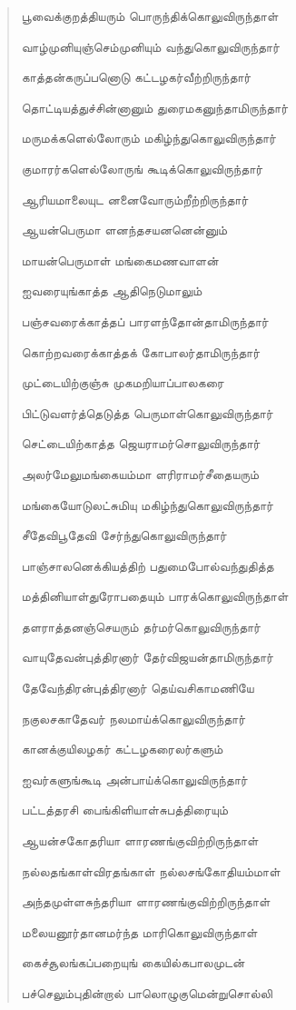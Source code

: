 \documentclass{article}
\begin{document}
\begin{quotation}
{பூவைக்குறத்தியரும் பொருந்திக்கொலுவிருந்தாள்

வாழ்முனியுஞ்செம்முனியும் வந்துகொலுவிருந்தார்

காத்தன்கருப்பனொடு கட்டழகர்வீற்றிருந்தார்

தொட்டியத்துச்சின்னானும் துரைமகனுந்தாமிருந்தார்

மருமக்களெல்லோரும் மகிழ்ந்துகொலுவிருந்தார்

குமாரர்களெல்லோருங் கூடிக்கொலுவிருந்தார்

ஆரியமாலையுட னனைவோரும்றீற்றிருந்தார்

ஆயன்பெருமா ளனந்தசயனனென்னும்

மாயன்பெருமாள் மங்கைமணவாளன்

ஐவரையுங்காத்த ஆதிநெடுமாலும்

பஞ்சவரைக்காத்தப் பாரளந்தோன்தாமிருந்தார்

கொற்றவரைக்காத்தக் கோபாலர்தாமிருந்தார்

முட்டையிற்குஞ்சு முகமறியாப்பாலகரை

பிட்டுவளர்த்தெடுத்த பெருமாள்கொலுவிருந்தார்

செட்டையிற்காத்த ஜெயராமர்சொலுவிருந்தார்

அலர்மேலுமங்கையம்மா ளரிராமர்சீதையரும்

மங்கையோடுலட்சுமியு மகிழ்ந்துகொலுவிருந்தார்

சீதேவிபூதேவி சேர்ந்துகொலுவிருந்தார்

பாஞ்சாலனெக்கியத்திற் பதுமைபோல்வந்துதித்த

மத்தினியாள்துரோபதையும் பாரக்கொலுவிருந்தாள்

தளராத்தனஞ்செயரும் தர்மர்கொலுவிருந்தார்

வாயுதேவன்புத்திரனார்‌ தேர்விஜயன்தாமிருந்தார்‌

தேவேந்திரன்புத்திரனார் தெய்வசிகாமணியே

நகுலசகாதேவர் நலமாய்க்கொலுவிருந்தார்

கானக்குயிலழகர் கட்டழகரைலர்களும்

ஐவர்களுங்கூடி அன்பாய்க்கொலுவிருந்தார்

பட்டத்தரசி பைங்கிளியாள்சுபத்திரையும்

ஆயன்சகோதரியா ளாரணங்குவிற்றிருந்தாள்

நல்லதங்காள்விரதங்காள் நல்லசங்கோதியம்மாள்

அந்தமுள்ளசுந்தரியா ளாரணங்குவிற்றிருந்தாள்

மலையனூர்தானமர்ந்த மாரிகொலுவிருந்தாள்

கைச்சூலங்கப்பறையுங் கையில்கபாலமுடன்

பச்செலும்புதின்றால் பாலொழுகுமென்றுசொல்லி

}
\end{quotation}
\end{document}
